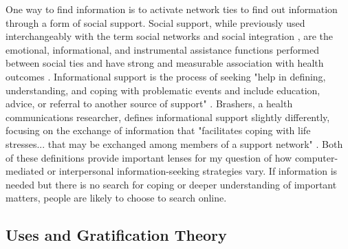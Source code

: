 One way to find information is to activate network ties to find out
information through a form of social support. Social support, while
previously used interchangeably with the term social networks and social
integration \citep{houseStructuresProcessesSocial1988}, are the emotional,
informational, and instrumental assistance functions performed between
social ties and have strong and measurable association with health
outcomes \citep{houseMeasuresConceptsSocial1985, thoitsMechanismsLinkingSocial2011}. Informational support is
the process of seeking "help in defining, understanding, and coping with
problematic events and include education, advice, or referral to another
source of support" \citep[p. 640]{winemiller_etal93}. Brashers, a health
communications researcher, defines informational support slightly
differently, focusing on the exchange of information that "facilitates
coping with life stresses... that may be exchanged among members of a
support network" \citeyearpar[p. 260]{brashersInformationSeekingAvoiding2002}.
Both of these definitions provide important
lenses for my question of how computer-mediated or interpersonal
information-seeking strategies vary. If information is needed but there
is no search for coping or deeper understanding of important matters,
people are likely to choose to search online.

\subsection{Uses and Gratification Theory}

